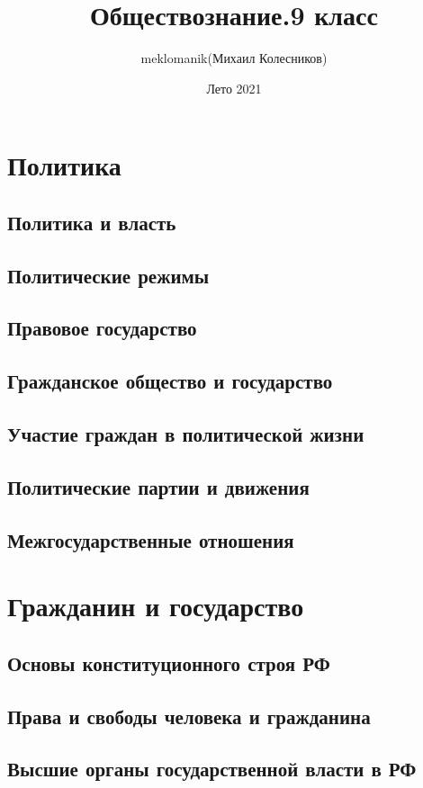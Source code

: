 \documentclass[a4paper, 12pt]{article}
\title{Обществознание.9 класс}
\author{meklomanik(Михаил Колесников)}
\date{Лето 2021}
\begin{document}
 
    \maketitle{} \clearpage
    \tableofcontents \clearpage
    \section{Политика}
        \subsection{Политика и власть}
        \subsection{Политические режимы}
        \subsection{Правовое государство}
        \subsection{Гражданское общество и государство}
        \subsection{Участие граждан в политической жизни}
        \subsection{Политические партии и движения}
        \subsection{Межгосударственные отношения}
    \section{Гражданин и государство}
        \subsection{Основы конституционного строя РФ}
        \subsection{Права и свободы человека и гражданина}
        \subsection{Высшие органы государственной власти в РФ}
\end{document}
